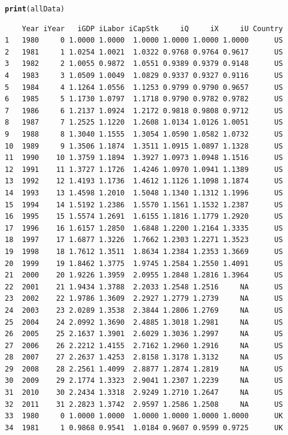 \documentclass[preprint,authoryear,12pt]{elsarticle}\usepackage{graphicx, color}
\makeatletter
\newcommand{\hlfunctioncall}[1]{\textcolor[rgb]{0.501960784313725,0,0.329411764705882}{\textbf{#1}}}%
\newenvironment{kframe}{%
 \def\at@end@of@kframe{}%
 \ifinner\ifhmode%
  \def\at@end@of@kframe{\end{minipage}}%
  \begin{minipage}{\columnwidth}%
 \fi\fi%
 \def\FrameCommand##1{\hskip\@totalleftmargin \hskip-\fboxsep
 \colorbox{shadecolor}{##1}\hskip-\fboxsep
     \hskip-\linewidth \hskip-\@totalleftmargin \hskip\columnwidth}%
 \MakeFramed {\advance\hsize-\width
   \@totalleftmargin\z@ \linewidth\hsize
   \@setminipage}}%
 {\par\unskip\endMakeFramed%
 \at@end@of@kframe}
\newenvironment{knitrout}{}{} %
\makeatother
\begin{document}
\begin{knitrout}
\begin{kframe}
{\ttfamily\noindent\bfseries\color{errorcolor}{Error: arguments imply differing number of rows: 222, 220}}\begin{alltt}

\hlfunctioncall{print}(allData)
\end{alltt}
\begin{verbatim}
    Year iYear   iGDP iLabor iCapStk     iQ     iX     iU Country
1   1980     0 1.0000 1.0000  1.0000 1.0000 1.0000 1.0000      US
2   1981     1 1.0254 1.0021  1.0322 0.9768 0.9764 0.9617      US
3   1982     2 1.0055 0.9872  1.0551 0.9389 0.9379 0.9148      US
4   1983     3 1.0509 1.0049  1.0829 0.9337 0.9327 0.9116      US
5   1984     4 1.1264 1.0556  1.1253 0.9799 0.9790 0.9657      US
6   1985     5 1.1730 1.0797  1.1718 0.9790 0.9782 0.9782      US
7   1986     6 1.2137 1.0924  1.2172 0.9818 0.9808 0.9712      US
8   1987     7 1.2525 1.1220  1.2608 1.0134 1.0126 1.0051      US
9   1988     8 1.3040 1.1555  1.3054 1.0590 1.0582 1.0732      US
10  1989     9 1.3506 1.1874  1.3511 1.0915 1.0897 1.1328      US
11  1990    10 1.3759 1.1894  1.3927 1.0973 1.0948 1.1516      US
12  1991    11 1.3727 1.1726  1.4246 1.0970 1.0941 1.1389      US
13  1992    12 1.4193 1.1736  1.4612 1.1126 1.1098 1.1874      US
14  1993    13 1.4598 1.2010  1.5048 1.1340 1.1312 1.1996      US
15  1994    14 1.5192 1.2386  1.5570 1.1561 1.1532 1.2387      US
16  1995    15 1.5574 1.2691  1.6155 1.1816 1.1779 1.2920      US
17  1996    16 1.6157 1.2850  1.6848 1.2200 1.2164 1.3335      US
18  1997    17 1.6877 1.3226  1.7662 1.2303 1.2271 1.3523      US
19  1998    18 1.7612 1.3511  1.8634 1.2384 1.2353 1.3669      US
20  1999    19 1.8462 1.3775  1.9745 1.2584 1.2550 1.4091      US
21  2000    20 1.9226 1.3959  2.0955 1.2848 1.2816 1.3964      US
22  2001    21 1.9434 1.3788  2.2033 1.2548 1.2516     NA      US
23  2002    22 1.9786 1.3609  2.2927 1.2779 1.2739     NA      US
24  2003    23 2.0289 1.3538  2.3844 1.2806 1.2769     NA      US
25  2004    24 2.0992 1.3690  2.4885 1.3018 1.2981     NA      US
26  2005    25 2.1637 1.3901  2.6029 1.3036 1.2997     NA      US
27  2006    26 2.2212 1.4155  2.7162 1.2960 1.2916     NA      US
28  2007    27 2.2637 1.4253  2.8158 1.3178 1.3132     NA      US
29  2008    28 2.2561 1.4099  2.8877 1.2874 1.2819     NA      US
30  2009    29 2.1774 1.3323  2.9041 1.2307 1.2239     NA      US
31  2010    30 2.2434 1.3318  2.9249 1.2710 1.2647     NA      US
32  2011    31 2.2823 1.3742  2.9597 1.2586 1.2508     NA      US
33  1980     0 1.0000 1.0000  1.0000 1.0000 1.0000 1.0000      UK
34  1981     1 0.9868 0.9541  1.0184 0.9607 0.9599 0.9725      UK

\end{verbatim}
\end{kframe}
\end{knitrout}
\end{document}

